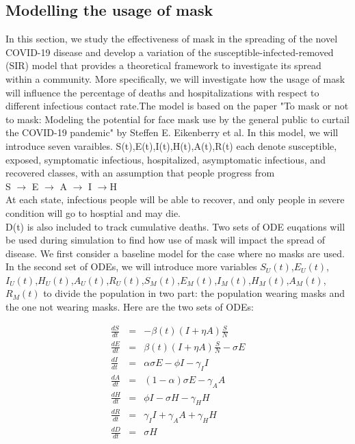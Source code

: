 \documentclass{article}
\begin{document}
\subsection{Modelling the usage of mask}
In this section, we study the effectiveness of mask in the spreading of the novel COVID-19 disease and develop a variation of the susceptible-infected-removed (SIR) model that provides a theoretical framework to investigate its spread within a community. More specifically, we will investigate how the usage of mask will influence the percentage of deaths and hospitalizations with respect to different infectious contact rate.The model is based on the paper "To mask or not to mask: Modeling the potential for face mask use by the general public to curtail the COVID-19 pandemic" by Steffen E. Eikenberry et al. In this model, we will introduce seven varaibles. S(t),E(t),I(t),H(t),A(t),R(t) each denote susceptible, exposed, symptomatic infectious, hospitalized, asymptomatic infectious, and recovered classes, with an assumption that people progress from \\
S $\rightarrow$ E $\rightarrow$ A $\rightarrow$ I $\rightarrow$H \\ At each state, infectious people will be able to recover, and only people in severe condition will go to hosptial and may die.\\D(t) is also included to track cumulative deaths. Two sets of ODE euqations will be used during simulation to find how use of mask will impact the spread of disease. We first consider a baseline model for the case where no masks are used. In the second set of ODEs, we will introduce more variables
$S_{U}(t)$,$E_{U}(t)$,$I_{U}(t)$,$H_{U}(t)$,$A_{U}(t)$,$R_{U}(t)$,$S_{M}(t)$,$E_{M}(t)$,$I_{M}(t)$,$H_{M}(t)$,$A_{M}(t)$,$R_{M}(t)$ to divide the population in two part: the population wearing masks and the one not wearing masks.
Here are the two sets of ODEs:\\
\begin{minipage}{0.45\textwidth}
\begin{eqnarray}
  \frac{dS}{dt} &=& -\beta{(t)}(I+\eta A)\frac{S}{N}\nonumber\\
  \frac{dE}{dt} &=& \beta(t)(I+\eta A)\frac{S}{N}-\sigma{E}\nonumber\\
  \frac{dI}{dt} &=& \alpha\sigma{E}-\phi{I}-\gamma_{I}I\nonumber\\
  \frac{dA}{dt} &=& (1-\alpha)\sigma E-\gamma_{A}A\nonumber\\
  \frac{dH}{dt} &=& \phi I - \sigma H - \gamma_{H}H\nonumber\\
  \frac{dR}{dt} &=& \gamma_{I}{I} + \gamma_{A}{A}+\gamma_{H}{H}\nonumber\\
  \frac{dD}{dt} &=& \sigma H\nonumber\\
\end{eqnarray}
\end{minipage}
\end{document}
